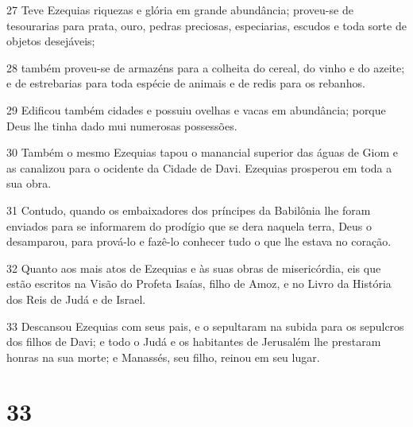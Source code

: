 \par 27 Teve Ezequias riquezas e glória em grande abundância; proveu-se de tesourarias para prata, ouro, pedras preciosas, especiarias, escudos e toda sorte de objetos desejáveis;
\par 28 também proveu-se de armazéns para a colheita do cereal, do vinho e do azeite; e de estrebarias para toda espécie de animais e de redis para os rebanhos.
\par 29 Edificou também cidades e possuiu ovelhas e vacas em abundância; porque Deus lhe tinha dado mui numerosas possessões.
\par 30 Também o mesmo Ezequias tapou o manancial superior das águas de Giom e as canalizou para o ocidente da Cidade de Davi. Ezequias prosperou em toda a sua obra.
\par 31 Contudo, quando os embaixadores dos príncipes da Babilônia lhe foram enviados para se informarem do prodígio que se dera naquela terra, Deus o desamparou, para prová-lo e fazê-lo conhecer tudo o que lhe estava no coração.
\par 32 Quanto aos mais atos de Ezequias e às suas obras de misericórdia, eis que estão escritos na Visão do Profeta Isaías, filho de Amoz, e no Livro da História dos Reis de Judá e de Israel.
\par 33 Descansou Ezequias com seus pais, e o sepultaram na subida para os sepulcros dos filhos de Davi; e todo o Judá e os habitantes de Jerusalém lhe prestaram honras na sua morte; e Manassés, seu filho, reinou em seu lugar.

\chapter{33}

